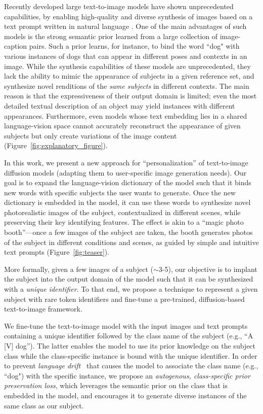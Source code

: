 Recently developed large text-to-image models have shown unprecedented capabilities, by enabling high-quality and diverse synthesis of images based on a text prompt written in natural language \cite{saharia2022photorealistic,ramesh2022hierarchical}. One of the main advantages of such models is the strong semantic prior learned from a large collection of image-caption pairs. Such a prior learns, for instance, to bind the word ``dog" with various instances of dogs that can appear in different poses and contexts in an image. While the synthesis capabilities of these models are unprecedented, they lack the ability to mimic the appearance of subjects in a given reference set, and synthesize novel renditions of the \emph{same subjects} in different contexts. The main reason is that the expressiveness of their output domain is limited;  even the most detailed textual description of an object may yield instances with different appearances. Furthermore, even models whose text embedding lies in a shared language-vision space \cite{radford2021learning} cannot accurately reconstruct the appearance of given subjects but only create variations of the image content (Figure~\ref{fig:explanatory_figure}). 

In this work, we present a new approach for ``personalization'' of text-to-image diffusion models (adapting them to user-specific image generation needs). Our goal is to expand the language-vision dictionary of the model such that it binds new words with specific subjects the user wants to generate. Once the new dictionary is embedded in the model, it can use these words to synthesize novel photorealistic images of the subject, contextualized in different scenes, while preserving their key identifying features. The effect is akin to a ``magic photo booth''---once a few images of the subject are taken, the booth generates photos of the subject in different conditions and scenes, as guided by simple and intuitive text prompts (Figure~\ref{fig:teaser}).

More formally, given a few images of a subject ($\sim$3-5), our objective is to implant the subject into the output domain of the model such that it can be synthesized with a \emph{unique identifier}. To that end, we propose a technique to represent a given subject with rare token identifiers and fine-tune a pre-trained, diffusion-based text-to-image framework. 

We fine-tune the text-to-image model with the input images and text prompts containing a unique identifier followed by the class name of the subject (e.g., ``A [V] dog”). The latter enables the model to use its prior knowledge on the subject class while the class-specific instance is bound with the unique identifier. In order to prevent \textit{language drift}~\cite{Lee2019CounteringLD,lu2020countering} that causes the model to associate the class name (e.g., ``dog") with the specific instance, we propose an \textit{autogenous, class-specific prior preservation loss}, which leverages the semantic prior on the class that is embedded in the model, and encourages it to generate diverse instances of the same class as our subject.

